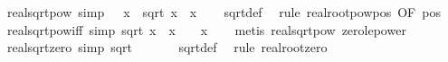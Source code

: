 \begin{isabellebody}
\ real{\isacharunderscore}{\kern0pt}sqrt{\isacharunderscore}{\kern0pt}pow{}\ {\isacharbrackleft}{\kern0pt}simp{\isacharbrackright}{\kern0pt}{\isacharcolon}{\kern0pt}\ {\isachardoublequoteopen}{}\ {\isasymle}\ x\ {\isasymLongrightarrow}\ {\isacharparenleft}{\kern0pt}sqrt\ x{\isacharparenright}{\kern0pt}\ {\isacharequal}{\kern0pt}\ x{\isachardoublequoteclose}\isanewline
%
\isadelimproof
\ \ %
\endisadelimproof
%
\isatagproof
{}\isamarkupfalse%
\ sqrt{\isacharunderscore}{\kern0pt}def\ \isamarkupfalse%
\ {\isacharparenleft}{\kern0pt}rule\ real{\isacharunderscore}{\kern0pt}root{\isacharunderscore}{\kern0pt}pow{\isacharunderscore}{\kern0pt}pos{}\ {\isacharbrackleft}{\kern0pt}OF\ pos{}{\isacharbrackright}{\kern0pt}{\isacharparenright}{\kern0pt}%
\endisatagproof
{\isafoldproof}%
%
\isadelimproof
\isanewline
%
\endisadelimproof
\isanewline
{}\isamarkupfalse%
\ real{\isacharunderscore}{\kern0pt}sqrt{\isacharunderscore}{\kern0pt}pow{}{\isacharunderscore}{\kern0pt}iff\ {\isacharbrackleft}{\kern0pt}simp{\isacharbrackright}{\kern0pt}{\isacharcolon}{\kern0pt}\ {\isachardoublequoteopen}{\isacharparenleft}{\kern0pt}sqrt\ x{\isacharparenright}{\kern0pt}\ {\isacharequal}{\kern0pt}\ x\ {\isasymlongleftrightarrow}\ {}\ {\isasymle}\ x{\isachardoublequoteclose}\isanewline
%
\isadelimproof
\ \ %
\endisadelimproof
%
\isatagproof
{}\isamarkupfalse%
\ {\isacharparenleft}{\kern0pt}metis\ real{\isacharunderscore}{\kern0pt}sqrt{\isacharunderscore}{\kern0pt}pow{}\ zero{\isacharunderscore}{\kern0pt}le{\isacharunderscore}{\kern0pt}power{}{\isacharparenright}{\kern0pt}%
\endisatagproof
{\isafoldproof}%
%
\isadelimproof
\isanewline
%
\endisadelimproof
\isanewline
{}\isamarkupfalse%
\ real{\isacharunderscore}{\kern0pt}sqrt{\isacharunderscore}{\kern0pt}zero\ {\isacharbrackleft}{\kern0pt}simp{\isacharbrackright}{\kern0pt}{\isacharcolon}{\kern0pt}\ {\isachardoublequoteopen}sqrt\ {}\ {\isacharequal}{\kern0pt}\ {}{\isachardoublequoteclose}\isanewline
%
\isadelimproof
\ \ %
\endisadelimproof
%
\isatagproof
{}\isamarkupfalse%
\ sqrt{\isacharunderscore}{\kern0pt}def\ \isamarkupfalse%
\ {\isacharparenleft}{\kern0pt}rule\ real{\isacharunderscore}{\kern0pt}root{\isacharunderscore}{\kern0pt}zero{\isacharparenright}{\kern0pt}%
\endisatagproof
{\isafoldproof}%
%
\isadelimproof
\isanewline
%
\endisadelimproof
\isanewline
{}\isamarkupfalse%

\end{isabellebody}
